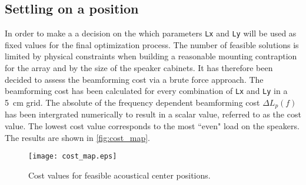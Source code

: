 \subsection{Settling on a position}\label{ssec:cost_map}
In order to make a a decision on the which parameters \textcolor{green3}{\texttt{Lx}} and \textcolor{green3}{\texttt{Ly}} will be used as fixed values for the final optimization process. The number of feasible solutions is limited by physical constraints when building a reasonable mounting contraption for the array and by the size of the speaker cabinets. It has therefore been decided to assess the beamforming cost via a brute force approach. The beamforming cost has been calculated for every combination of \textcolor{green3}{\texttt{Lx}} and \textcolor{green3}{\texttt{Ly}} in a \SI{5}{\centi\meter} grid. The absolute of the frequency dependent beamforming cost $\Delta L_{p}(f)$ has been intergrated numerically to result in a scalar value, referred to as the cost value. The lowest cost value corresponds to the most ``even" load on the speakers. The results are shown in \autoref{fig:cost_map}.
\begin{figure}[h]
	\centering
	\texttt{[image: cost\_map.eps]}
	\caption{Cost values for feasible acoustical center positions.}
		\label{fig:cost_map}
\end{figure}

